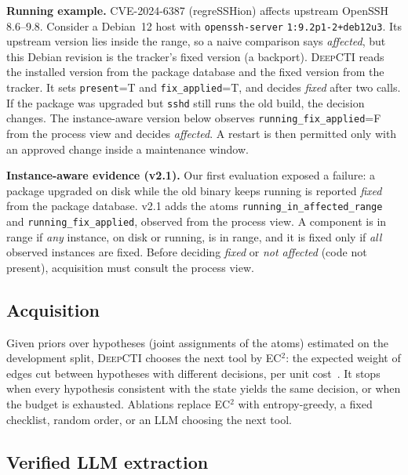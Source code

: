 \documentclass[conference]{IEEEtran}
\newcommand{\DC}{\textsc{DeepCTI}}
\newcommand{\Bel}[1]{\textsf{#1}}
\begin{document}
\textbf{Running example.} CVE-2024-6387 (regreSSHion) affects upstream OpenSSH 8.6--9.8. Consider a
Debian~12 host with \texttt{openssh-server} \texttt{1:9.2p1-2+deb12u3}. Its upstream version lies inside
the range, so a naive comparison says \emph{affected}, but this Debian revision is the tracker's fixed
version (a backport). \DC{} reads the installed version from the package database and the fixed version
from the tracker. It sets \texttt{present}=\Bel{T} and \texttt{fix\_applied}=\Bel{T}, and decides
\emph{fixed} after two calls. If the package was upgraded but \texttt{sshd} still runs the old build,
the decision changes. The instance-aware version below observes \texttt{running\_fix\_applied}=\Bel{F}
from the process view and decides \emph{affected}. A restart is then permitted only with an approved
change inside a maintenance window.

\textbf{Instance-aware evidence (v2.1).} Our first evaluation exposed a failure: a package upgraded on
disk while the old binary keeps running is reported \emph{fixed} from the package database. v2.1 adds the
atoms \texttt{running\_in\_affected\_range} and \texttt{running\_fix\_applied}, observed from the process
view. A component is in range if \emph{any} instance, on disk or running, is in range, and it is fixed only
if \emph{all} observed instances are fixed. Before deciding \emph{fixed} or \emph{not affected} (code not present),
acquisition must consult the process view.

\subsection{Acquisition}

Given priors over hypotheses (joint assignments of the atoms) estimated on the development split,
\DC{} chooses the next tool by EC$^2$: the expected weight of edges cut between hypotheses with different
decisions, per unit cost~\cite{golovin2010ec2}. It stops when every hypothesis consistent with the state
yields the same decision, or when the budget is exhausted. Ablations replace EC$^2$ with entropy-greedy,
a fixed checklist, random order, or an LLM choosing the next tool.

\subsection{Verified LLM extraction}
\end{document}
